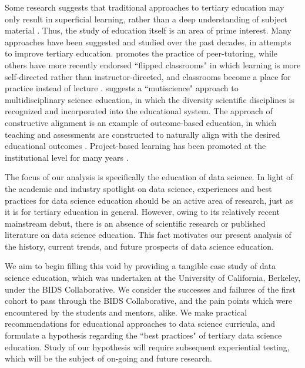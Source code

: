 \documentclass[12pt]{article}
\begin{document}
Some research suggests that traditional approaches to tertiary education may only result in superficial learning, rather than a deep understanding of subject material \citep{Entwistle1992}.  Thus, the study of education itself is an area of prime interest.  Many approaches have been suggested and studied over the past decades, in attempts to improve tertiary education.  \citet{Topping1996} promotes the practice of peer-tutoring, while others have more recently endorsed ``flipped classrooms" in which learning is more self-directed rather than instructor-directed, and classrooms become a place for practice instead of lecture \citep{Horn2013, Herreid2013}.  \citet{Ogawa1995} suggests a ``mutiscience" approach to multidisciplinary science education, in which the diversity scientific disciplines is recognized and incorporated into the educational system.  The approach of constructive alignment is an example of outcome-based education, in which teaching and assessments are constructed to naturally align with the desired educational outcomes \citep{biggs2003aligning, biggs2011teaching}.  Project-based learning has been promoted at the institutional level for many years \citep{Krajcik2006, Thomas2000}.

The focus of our analysis is specifically the education of data science. In light of the academic and industry spotlight on data science, experiences and best practices for data science education should be an active area of research, just as it is for tertiary education in general.  However, owing to its relatively recent mainstream debut, there is an absence of scientific research or published literature on data science education.  This fact motivates our present analysis of the history, current trends, and future prospects of data science education.

We aim to begin filling this void by providing a tangible case study of data science education, which was undertaken at the University of California, Berkeley, under the BIDS Collaborative. We consider the successes and failures of the first cohort to pass through the BIDS Collaborative, and the pain points which were encountered by the students and mentors, alike.  We make practical recommendations for educational approaches to data science curricula, and formulate a hypothesis regarding the ``best practices" of tertiary data science education.  Study of our hypothesis will require subsequent experiential testing, which will be the subject of on-going and future research.
\end{document}
